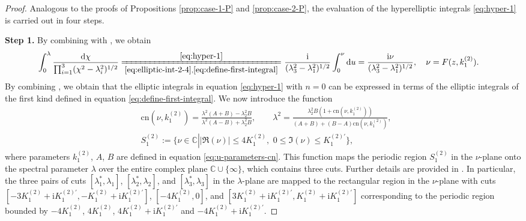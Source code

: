 \documentclass[11pt,reqno]{amsart}
\newcommand{\ii}{\mathrm{i}}
\newcommand{\cn}{\mathrm{cn}}
\newcommand{\dd}{\mathrm{d}}
\numberwithin{equation}{section}
\begin{document}
\begin{proof}
	Analogous to the proofs of Propositions \ref{prop:case-1-P} and \ref{prop:case-2-P}, the evaluation of the hyperelliptic integrals \eqref{eq:hyper-1} is carried out in four steps.
	
	\textbf{Step 1.}
	By combining  with , 
	we obtain 
	\begin{equation}\nonumber
		\begin{split}
			\int_{0}^{\lambda}\frac{\dd \chi}{\prod_{i=1}^3(\chi^2-\lambda_i^2)^{1/2}}\xlongequal[\eqref{eq:elliptic-int-2-4},\eqref{eq:define-first-integral}]{\eqref{eq:hyper-1}}&\ 
			 \frac{ \ii }{(\lambda_3^2-\lambda_1^2)^{1/2}}\int_{0}^{\nu} \dd u
			= \frac{\ii \nu}{(\lambda_3^2-\lambda_1^2)^{1/2}}, \quad \nu=F(z,  k^{(2)}_1).
		\end{split}	
	\end{equation}
	By combining , we obtain that the elliptic integrals in equation \eqref{eq:hyper-1} with $n=0$ can be expressed in terms of the elliptic integrals of the first kind defined in equation \eqref{eq:define-first-integral}.
	We now introduce the function
	\begin{equation}\label{eq:fs-4}
		\begin{split}
			&\cn(\nu,  k^{(2)}_1)=\frac{\lambda^2(A+B)-\lambda_2^2B}{\lambda^2(A-B)+\lambda_2^2B},
			\qquad 
			\lambda^2=\frac{\lambda_2^2B(1+\cn(\nu,  k^{(2)}_1))}{(A+B)+(B-A)\cn(\nu,  k^{(2)}_1)},\\
			&S_1^{(2)}:=\{\nu\in \mathbb{C}\left| |\Re(\nu)|\le 4  K^{(2)}_1, \,\, 0\le \Im(\nu)\le   K^{(2)\prime}_1 \right.\},
		\end{split}
	\end{equation}
	where parameters $k^{(2)}_1$, $A$, $B$ are defined in equation \eqref{eq:u-parameters-cn}.
	This function maps the periodic region $S^{(2)}_1$ in the $\nu$-plane onto the spectral parameter $\lambda$ over the entire complex plane $\mathbb{C}\cup \{ \infty \}$, which contains three cuts.
	Further details are provided in \Cref{prop:appendenx-f-3-4}. 
	In particular, the three pairs of cuts $[\lambda_1^*, \lambda_1]$, $[\lambda_2^*, \lambda_2]$, and $[\lambda_3^*, \lambda_3]$ in the $\lambda$-plane are mapped to the rectangular region in the $\nu$-plane with cuts $[-3K^{(2)}_1+\ii K^{(2)\prime}_1 , -K^{(2)}_1+\ii K^{(2)\prime}_1]$, $[-4 K^{(2)}_1 , 0]$, and $[3K^{(2)}_1+\ii K^{(2)\prime}_1, K^{(2)}_1+\ii K^{(2)\prime}_1]$ corresponding to the periodic region bounded by $-4K^{(2)}_1$, $4K^{(2)}_1$, $4K^{(2)}_1+\ii K^{(2)\prime}_1$ and $-4K^{(2)}_1+\ii K^{(2)\prime}_1$.
	

\end{proof}
\end{document}
